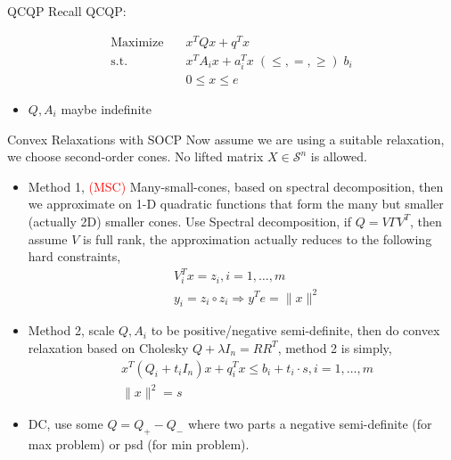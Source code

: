 

\usepackage{subfig}
\usepackage[style=authoryear]{biblatex}
\usepackage{bm}

\date{\today}




\fontsize{9pt}{11}\selectfont
\frame{\titlepage}
\begin{frame}{QCQP}
  Recall QCQP:

  \begin{equation}
    \begin{aligned}
      \mathrm{Maximize}\quad & x^TQx + q^T x                                   \\
      \mathrm{s.t.}  \quad   & x^{T} A_i x  + a_i^Tx   \; (\le, =, \ge) \; b_i \\
                             & 0\le x\le e
    \end{aligned}
  \end{equation}

  \begin{itemize}
    \item \(Q, A_i\) maybe indefinite
  \end{itemize}
\end{frame}
\begin{frame}{Convex Relaxations with SOCP}
  Now assume we are using a suitable relaxation, we choose second-order cones. No lifted matrix \(X \in \mathscr{S}^n\) is allowed.
  \begin{itemize}
    \item Method 1, \textcolor{red}{(MSC)} Many-small-cones, based on spectral decomposition, then we approximate on 1-D quadratic functions that form the many but smaller (actually 2D) smaller cones. Use Spectral decomposition, if \(Q = V\Gamma V^T\), then assume \(V\) is full rank, the approximation actually reduces to the following hard constraints,
          \begin{equation}\label{eq:primal.msc}
            \begin{aligned}
               & V_i^Tx = z_i,i= 1,\dots, m                     \\
               & y_i = z_i \circ z_i \Rightarrow y^Te = \|x\|^2
            \end{aligned}
          \end{equation}
    \item Method 2, scale \(Q, A_i\) to be positive/negative semi-definite, then do convex relaxation based on Cholesky \(Q +\lambda I_n = RR^T\), method 2 is simply,
          \begin{equation}\label{eq:primal.scale}
            \begin{aligned}
               & x^T(Q_i+t_i I_n) x+q_i^T x \leqslant b_i+ t_i \cdot s,i= 1,\dots, m \\
               & \|x\|^2= s
            \end{aligned}
          \end{equation}
    \item DC, use some \(Q = Q_+ - Q_-\) where two parts a negative semi-definite (for max problem) or psd (for min problem).
  \end{itemize}
\end{frame}
